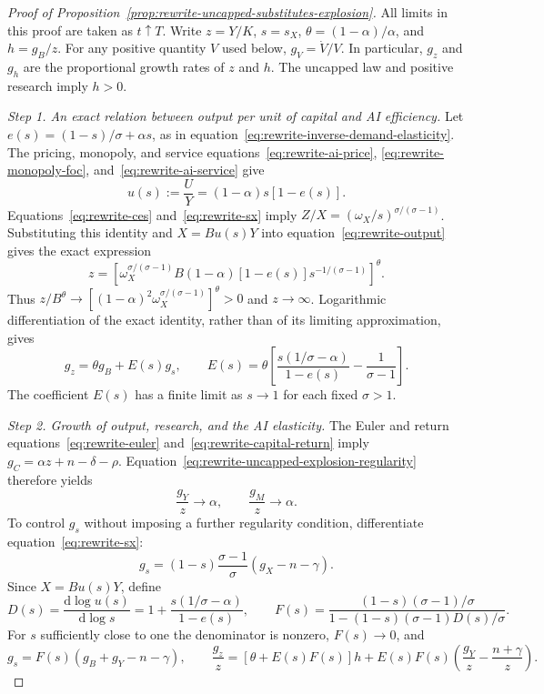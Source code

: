 \begin{proof}[Proof of Proposition~\ref{prop:rewrite-uncapped-substitutes-explosion}]
\label{proof:rewrite-uncapped-substitutes-explosion}
All limits in this proof are taken as $t\uparrow T$. Write
$z=Y/K$, $s=s_X$, $\theta=(1-\alpha)/\alpha$, and $h=g_B/z$.
For any positive quantity $V$ used below, $g_V=\dot V/V$.
In particular, $g_z$ and $g_h$ are the proportional growth rates of $z$ and $h$.
The uncapped law and positive research imply $h>0$.

\textit{Step 1. An exact relation between output per unit of capital and AI efficiency.}
Let $e(s)=(1-s)/\sigma+\alpha s$, as in
equation~\eqref{eq:rewrite-inverse-demand-elasticity}.
The pricing, monopoly, and service equations~\eqref{eq:rewrite-ai-price},
\eqref{eq:rewrite-monopoly-foc}, and~\eqref{eq:rewrite-ai-service} give
\[
 u(s):=\frac UY=(1-\alpha)s[1-e(s)].
\]
Equations~\eqref{eq:rewrite-ces} and~\eqref{eq:rewrite-sx} imply
$Z/X=(\omega_X/s)^{\sigma/(\sigma-1)}$.
Substituting this identity and $X=Bu(s)Y$ into
equation~\eqref{eq:rewrite-output} gives the exact expression
\begin{equation}
 z=\left[
 \omega_X^{\sigma/(\sigma-1)}B(1-\alpha)[1-e(s)]
 s^{-1/(\sigma-1)}\right]^\theta.
 \label{eq:rewrite-uncapped-explosion-static}
\end{equation}
Thus $z/B^\theta\to
[(1-\alpha)^2\omega_X^{\sigma/(\sigma-1)}]^\theta>0$ and $z\to\infty$.
Logarithmic differentiation of the exact identity, rather than of its
limiting approximation, gives
\[
 g_z=\theta g_B+E(s)g_s,\qquad
 E(s)=\theta\left[
 \frac{s(1/\sigma-\alpha)}{1-e(s)}-\frac1{\sigma-1}\right].
\]
The coefficient $E(s)$ has a finite limit as $s\to1$ for each fixed $\sigma>1$.

\textit{Step 2. Growth of output, research, and the AI elasticity.}
The Euler and return equations~\eqref{eq:rewrite-euler}
and~\eqref{eq:rewrite-capital-return} imply
$g_C=\alpha z+n-\delta-\rho$.
Equation~\eqref{eq:rewrite-uncapped-explosion-regularity} therefore yields
\begin{equation}
 \frac{g_Y}{z}\to\alpha,\qquad \frac{g_M}{z}\to\alpha.
 \label{eq:rewrite-uncapped-explosion-growth-ratios}
\end{equation}
To control $g_s$ without imposing a further regularity condition, differentiate
equation~\eqref{eq:rewrite-sx}:
\[
 g_s=(1-s)\frac{\sigma-1}{\sigma}(g_X-n-\gamma).
\]
Since $X=Bu(s)Y$, define
\[
 D(s)=\frac{\mathrm d\log u(s)}{\mathrm d\log s}
 =1+\frac{s(1/\sigma-\alpha)}{1-e(s)},\qquad
 F(s)=\frac{(1-s)(\sigma-1)/\sigma}
 {1-(1-s)(\sigma-1)D(s)/\sigma}.
\]
For $s$ sufficiently close to one the denominator is nonzero, $F(s)\to0$,
and
\[
 g_s=F(s)(g_B+g_Y-n-\gamma),\qquad
 \frac{g_z}{z}=[\theta+E(s)F(s)]h
       +E(s)F(s)\left(\frac{g_Y}{z}-\frac{n+\gamma}{z}\right).
\]


\end{proof}
